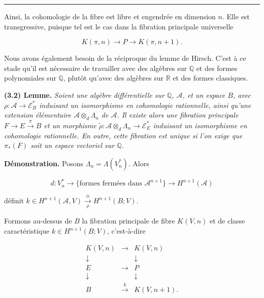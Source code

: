 \documentclass[
  french,
  a3paper,
  a3paper]{extarticle}
\begin{document}
\clearpage



\par

\vspace{0.7mm}\hrule\vspace{1.6mm}

\fontsize{9}{11}\selectfont

Ainsi, la cohomologie de la fibre est libre et engendrée en dimension
\(n\). Elle est transgressive, puisque tel est le cas dans la fibration
principale universelle

\[K(\pi,n)\longrightarrow P\longrightarrow K(\pi,n+1).\]

Nous avons également besoin de la réciproque du lemme de Hirsch. C'est à
ce stade qu'il est nécessaire de travailler avec des algèbres sur
\(\mathbb Q\) et des formes polynomiales sur \(\mathbb Q\), plutôt
qu'avec des algèbres sur \(\mathbb R\) et des formes classiques.

\textbf{(3.2) Lemme.} \emph{Soient une algèbre différentielle sur
\(\mathbb Q\), \(\mathcal A\), et un espace \(B\), avec
\(\rho:\mathcal A\longrightarrow\mathcal E_B^*\) induisant un
isomorphisme en cohomologie rationnelle, ainsi qu'une extension
élémentaire \(\mathcal A\otimes_d\Lambda_n\) de \(\mathcal A\). Il
existe alors une fibration principale
\(F\longrightarrow E\xrightarrow{\pi}B\) et un morphisme
\(\widetilde\rho:\mathcal A\otimes_d\Lambda_n\longrightarrow\mathcal E_E^*\)
induisant un isomorphisme en cohomologie rationnelle. En outre, cette
fibration est unique si l'on exige que \(\pi_*(F)\) soit un espace
vectoriel sur \(\mathbb Q\).}

\textbf{Démonstration.} Posons \(\Lambda_n=\Lambda(V_n^*)\). Alors

\[d:V_n^*\longrightarrow\{\text{formes fermées dans }\mathcal A^{n+1}\}\longrightarrow H^{n+1}(\mathcal A)\]

définit
\(k\in H^{n+1}(\mathcal A,V)\xrightarrow[\rho]{\cong}H^{n+1}(B;V)\).

Formons au-dessus de \(B\) la fibration principale de fibre \(K(V,n)\)
et de classe caractéristique \(k\in H^{n+1}(B;V)\), c'est-à-dire

\[\begin{array}{ccc}K(V,n)&\longrightarrow&K(V,n)\\\downarrow&&\downarrow\\E&\longrightarrow&P\\\downarrow&&\downarrow\\B&\xrightarrow{k}&K(V,n+1).\end{array}\]
\end{document}
